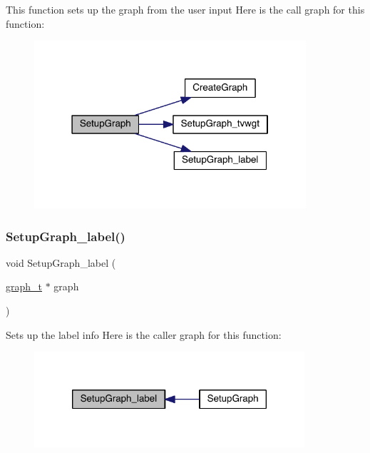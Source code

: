This function sets up the graph from the user input Here is the call graph for this function\+:\nopagebreak
\begin{figure}[H]
\begin{center}
\leavevmode
\includegraphics[width=286pt]{a00945_a9192cba632de98d1759721a5676eaf05_cgraph}
\end{center}
\end{figure}
\mbox{\label{a00945_a6513355a80c360956e3f38816621ae1e}} 
\subsubsection{\texorpdfstring{Setup\+Graph\+\_\+label()}{SetupGraph\_label()}}
{\footnotesize\ttfamily void Setup\+Graph\+\_\+label (\begin{DoxyParamCaption}\item[{\hyperlink{a00734}{graph\+\_\+t} $\ast$}]{graph }\end{DoxyParamCaption})}

Set\textquotesingle{}s up the label info Here is the caller graph for this function\+:\nopagebreak
\begin{figure}[H]
\begin{center}
\leavevmode
\includegraphics[width=284pt]{a00945_a6513355a80c360956e3f38816621ae1e_icgraph}
\end{center}
\end{figure}
\mbox{\label{a00945_a274db8b39f4bc294fcb5757b01ae31f1}} 
